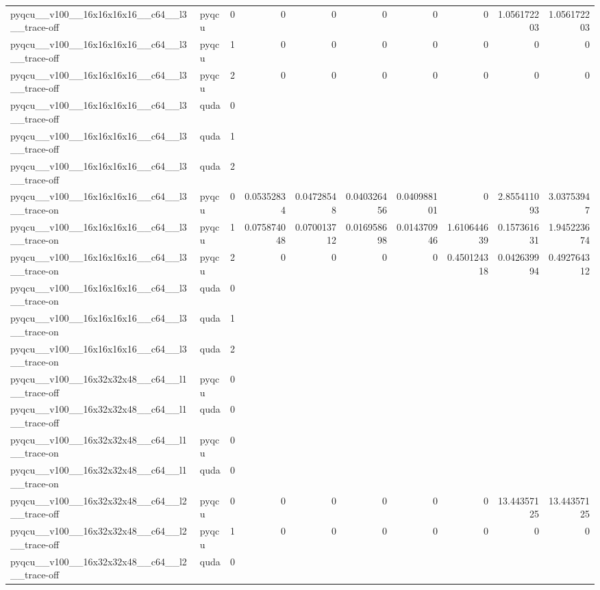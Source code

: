 \begin{table}[htbp]
\begin{tabular}{@{}llrrrrrrrr@{}}
pyqcu\_\_v100\_\_16x16x16x16\_\_c64\_\_l3\_\_trace-off & pyqcu & 0 & 0 & 0 & 0 & 0 & 0 & 1.056172203 & 1.056172203 \\
pyqcu\_\_v100\_\_16x16x16x16\_\_c64\_\_l3\_\_trace-off & pyqcu & 1 & 0 & 0 & 0 & 0 & 0 & 0 & 0 \\
pyqcu\_\_v100\_\_16x16x16x16\_\_c64\_\_l3\_\_trace-off & pyqcu & 2 & 0 & 0 & 0 & 0 & 0 & 0 & 0 \\
pyqcu\_\_v100\_\_16x16x16x16\_\_c64\_\_l3\_\_trace-off & quda & 0 &  &  &  &  &  &  &  \\
pyqcu\_\_v100\_\_16x16x16x16\_\_c64\_\_l3\_\_trace-off & quda & 1 &  &  &  &  &  &  &  \\
pyqcu\_\_v100\_\_16x16x16x16\_\_c64\_\_l3\_\_trace-off & quda & 2 &  &  &  &  &  &  &  \\
pyqcu\_\_v100\_\_16x16x16x16\_\_c64\_\_l3\_\_trace-on & pyqcu & 0 & 0.05352834 & 0.04728548 & 0.040326456 & 0.040988101 & 0 & 2.855411093 & 3.03753947 \\
pyqcu\_\_v100\_\_16x16x16x16\_\_c64\_\_l3\_\_trace-on & pyqcu & 1 & 0.075874048 & 0.070013712 & 0.016958698 & 0.014370946 & 1.610644639 & 0.157361631 & 1.945223674 \\
pyqcu\_\_v100\_\_16x16x16x16\_\_c64\_\_l3\_\_trace-on & pyqcu & 2 & 0 & 0 & 0 & 0 & 0.450124318 & 0.042639994 & 0.492764312 \\
pyqcu\_\_v100\_\_16x16x16x16\_\_c64\_\_l3\_\_trace-on & quda & 0 &  &  &  &  &  &  &  \\
pyqcu\_\_v100\_\_16x16x16x16\_\_c64\_\_l3\_\_trace-on & quda & 1 &  &  &  &  &  &  &  \\
pyqcu\_\_v100\_\_16x16x16x16\_\_c64\_\_l3\_\_trace-on & quda & 2 &  &  &  &  &  &  &  \\
pyqcu\_\_v100\_\_16x32x32x48\_\_c64\_\_l1\_\_trace-off & pyqcu & 0 &  &  &  &  &  &  &  \\
pyqcu\_\_v100\_\_16x32x32x48\_\_c64\_\_l1\_\_trace-off & quda & 0 &  &  &  &  &  &  &  \\
pyqcu\_\_v100\_\_16x32x32x48\_\_c64\_\_l1\_\_trace-on & pyqcu & 0 &  &  &  &  &  &  &  \\
pyqcu\_\_v100\_\_16x32x32x48\_\_c64\_\_l1\_\_trace-on & quda & 0 &  &  &  &  &  &  &  \\
pyqcu\_\_v100\_\_16x32x32x48\_\_c64\_\_l2\_\_trace-off & pyqcu & 0 & 0 & 0 & 0 & 0 & 0 & 13.44357125 & 13.44357125 \\
pyqcu\_\_v100\_\_16x32x32x48\_\_c64\_\_l2\_\_trace-off & pyqcu & 1 & 0 & 0 & 0 & 0 & 0 & 0 & 0 \\
pyqcu\_\_v100\_\_16x32x32x48\_\_c64\_\_l2\_\_trace-off & quda & 0 &  &  &  &  &  &  &  \\

\end{tabular}
\end{table}
